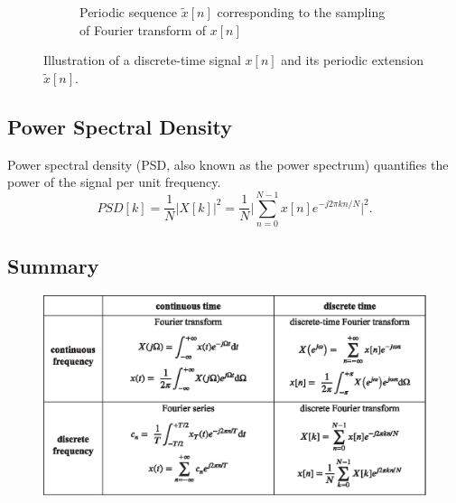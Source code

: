 \begin{figure}[H]
\begin{subfigure}{\textwidth}
\caption{Periodic sequence $\widetilde{x}[n]$ corresponding to the sampling of Fourier transform of $x[n]$}
\end{subfigure}
\caption{Illustration of a discrete-time signal $x[n]$ and its periodic extension $\widetilde{x}[n]$.}
\end{figure}

\subsection{Power Spectral Density}
Power spectral density (PSD, also known as the power spectrum) quantifies the power of the signal per unit frequency.
\[
    PSD[k] = \frac{1}{N}\lvert X[k] \rvert^2 = \frac{1}{N} \bigg \lvert  \sum_{n=0}^{N-1} x[n] e^{-j 2 \pi kn/N}\bigg \rvert^2. 
\]

\subsection{Summary}
\begin{figure}[H]
    \centering
    \includegraphics{images/summary_of_FTs.eps}
\end{figure}

